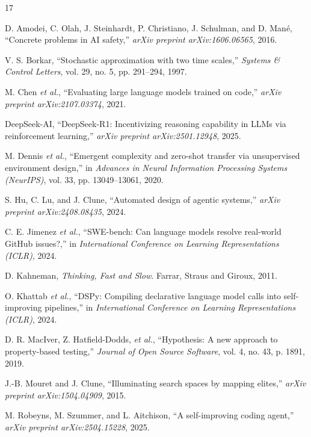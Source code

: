 \documentclass[10pt,twocolumn,letterpaper]{article}
\begin{document}
\begin{thebibliography}{17}

D. Amodei, C. Olah, J. Steinhardt, P. Christiano, J. Schulman, and D. Man\'{e}, ``Concrete problems in AI safety,'' \emph{arXiv preprint arXiv:1606.06565}, 2016.

V. S. Borkar, ``Stochastic approximation with two time scales,'' \emph{Systems \& Control Letters}, vol. 29, no. 5, pp. 291--294, 1997.

M. Chen \emph{et al.}, ``Evaluating large language models trained on code,'' \emph{arXiv preprint arXiv:2107.03374}, 2021.

DeepSeek-AI, ``DeepSeek-R1: Incentivizing reasoning capability in LLMs via reinforcement learning,'' \emph{arXiv preprint arXiv:2501.12948}, 2025.

M. Dennis \emph{et al.}, ``Emergent complexity and zero-shot transfer via unsupervised environment design,'' in \emph{Advances in Neural Information Processing Systems (NeurIPS)}, vol. 33, pp. 13049--13061, 2020.

S. Hu, C. Lu, and J. Clune, ``Automated design of agentic systems,'' \emph{arXiv preprint arXiv:2408.08435}, 2024.

C. E. Jimenez \emph{et al.}, ``SWE-bench: Can language models resolve real-world GitHub issues?,'' in \emph{International Conference on Learning Representations (ICLR)}, 2024.

D. Kahneman, \emph{Thinking, Fast and Slow}. Farrar, Straus and Giroux, 2011.

O. Khattab \emph{et al.}, ``DSPy: Compiling declarative language model calls into self-improving pipelines,'' in \emph{International Conference on Learning Representations (ICLR)}, 2024.

D. R. MacIver, Z. Hatfield-Dodds, \emph{et al.}, ``Hypothesis: A new approach to property-based testing,'' \emph{Journal of Open Source Software}, vol. 4, no. 43, p. 1891, 2019.

J.-B. Mouret and J. Clune, ``Illuminating search spaces by mapping elites,'' \emph{arXiv preprint arXiv:1504.04909}, 2015.

M. Robeyns, M. Szummer, and L. Aitchison, ``A self-improving coding agent,'' \emph{arXiv preprint arXiv:2504.15228}, 2025.


\end{thebibliography}
\end{document}
